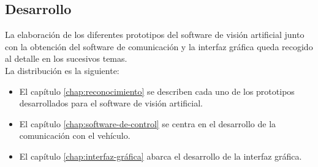 \subsection{Desarrollo}

La elaboración de los diferentes prototipos del software de visión artificial junto con la obtención del software de comunicación y la interfaz gráfica queda recogido al detalle en los sucesivos temas.\\

La distribución es la siguiente:

\begin{itemize}
\item El capítulo \ref{chap:reconocimiento} se describen cada uno de los prototipos desarrollados para el software de visión artificial. 
\item El capítulo \ref{chap:software-de-control} se centra en el desarrollo de la comunicación con el vehículo. 
\item El capítulo \ref{chap:interfaz-gráfica} abarca el desarrollo de la interfaz gráfica.
\end{itemize}


